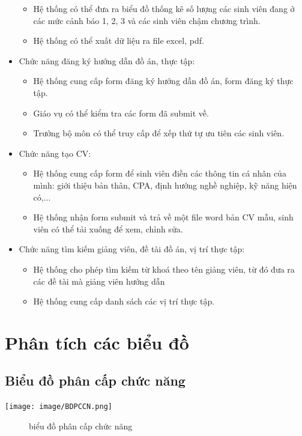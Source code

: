 \begin{itemize}
	      \begin{itemize}
		      \item Hệ thống có thể đưa ra biểu đồ thống kê số lượng các sinh viên đang ở các mức cảnh báo 1, 2, 3 và các sinh viên chậm chương trình.
		      \item Hệ thống có thể xuất dữ liệu ra file excel, pdf.
	      \end{itemize}
	\item Chức năng đăng ký hướng dẫn đồ án, thực tập:
	      \begin{itemize}
		      \item Hệ thống cung cấp form đăng ký hướng dẫn đồ án, form đăng ký thực tập.
		      \item Giáo vụ có thể kiểm tra các form đã submit về.
		      \item Trưởng bộ môn có thể truy cấp để xếp thứ tự ưu tiên các sinh viên.
	      \end{itemize}
	\item Chức năng tạo CV:
	      \begin{itemize}
		      \item Hệ thống cung cấp form để sinh viên điền các thông tin cá nhân của mình: giới thiệu bản thân, CPA, định hướng nghề nghiệp, kỹ năng hiện có,...
		      \item Hệ thống nhận form submit và trả về một file word bản CV mẫu, sinh viên có thể tải xuống để xem, chỉnh sửa.
	      \end{itemize}
	\item Chức năng tìm kiếm giảng viên, đề tài đồ án, vị trí thực tập:
	      \begin{itemize}
		      \item Hệ thống cho phép tìm kiếm từ khoá theo tên giảng viên, từ đó đưa ra các đề tài mà giảng viên hướng dẫn
		      \item Hệ thống cung cấp danh sách các vị trí thực tập.
	      \end{itemize}
\end{itemize}


\chapter{Phân tích các biểu đồ}
\section{Biểu đồ phân cấp chức năng}
\begin{center}
	\texttt{[image: image/BDPCCN.png]}
	\begin{figure}
		\centering
		\caption{biểu đồ phân cấp chức năng}
	\end{figure}
\end{center}

